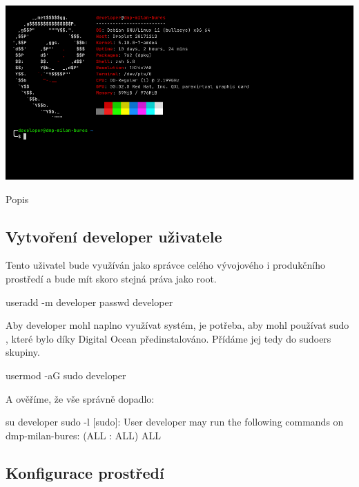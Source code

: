 \documentclass[12pt,a4paper]{report}
\begin{document}
  \vspace*{0.5cm}
  \noindent\includegraphics[width=\linewidth]{VPS.png}
  \begin{center}
    Popis
  \end{center}
  \vspace*{0.5cm}

  \subsection{Vytvoření developer uživatele}
  Tento uživatel bude využíván jako správce celého vývojového i produkčního prostředí a bude mít skoro stejná
  práva jako root. \\
  \begin{bash}
    useradd -m developer
    passwd developer
  \end{bash}
  Aby developer mohl naplno využívat systém, je potřeba, aby mohl používat sudo , které bylo díky
  Digital Ocean předinstalováno. Přídáme jej tedy do sudoers skupiny.\\
  \begin{bash}
    usermod -aG sudo developer
  \end{bash}
  A ověříme, že vše správně dopadlo:\\
  \begin{bash}
   su developer
   sudo -l
   [sudo]:
   User developer may run the following commands on dmp-milan-bures:
   (ALL : ALL) ALL
  \end{bash}


  \subsection{Konfigurace prostředí}
\end{document}
